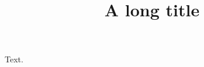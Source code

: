 \documentclass{article}
\newcommand{\shorttitle}{Short title}
\begin{document}
\title[\shorttitle]{A long title}
\maketitle
Text.
\end{document}
